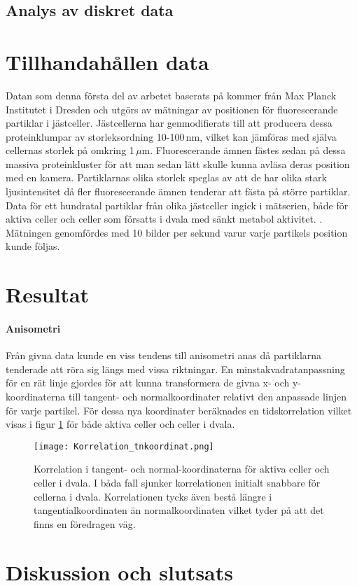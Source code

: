 \subsection{Analys av diskret data}


\section{Tillhandahållen data}

Datan som denna första del av arbetet baserats på kommer från Max Planck Institutet i Dresden och utgörs av mätningar av positionen för fluorescerande partiklar i jästceller. Jästcellerna har genmodifierats till att producera dessa proteinklumpar av storleksordning 10-100\,nm, vilket kan jämföras med själva cellernas storlek på omkring 1\,$\mu$m.  Fluorescerande ämnen fästes sedan på dessa massiva proteinkluster för att man sedan lätt skulle kunna avläsa deras position med en kamera. Partiklarnas olika storlek speglas av att de har olika stark ljusintensitet då fler fluorescerande ämnen tenderar att fästa på större partiklar.
Data för ett hundratal partiklar från olika jästceller ingick i mätserien, både för aktiva celler och celler som försatts i dvala med sänkt metabol aktivitet. . Mätningen genomfördes med 10 bilder per sekund varur varje partikels position kunde följas.


\section{Resultat}


\paragraph{Anisometri} Från givna data kunde en viss tendens till anisometri anas då partiklarna tenderade att röra sig längs med vissa riktningar. En minstakvadratanpassning för en rät linje gjordes för att kunna transformera de givna x- och y-koordinaterna till tangent- och normalkoordinater relativt den anpassade linjen för varje partikel. För dessa nya koordinater beräknades en tidskorrelation vilket visas i figur \ref{fig:Koor_tn} för både aktiva celler och celler i dvala.

\begin{figure}
    \centering
    \texttt{[image: Korrelation\_tnkoordinat.png]}
    \caption{Korrelation i tangent- och normal-koordinaterna för aktiva celler och celler i dvala. I båda fall sjunker korrelationen initialt snabbare för cellerna i dvala. Korrelationen tycks även bestå längre i tangentialkoordinaten än normalkoordinaten vilket tyder på att det finns en föredragen väg.}
    \label{fig:Koor_tn}
\end{figure}


\section{Diskussion och slutsats}
